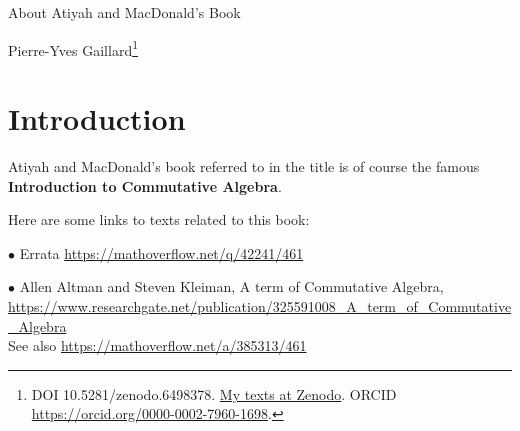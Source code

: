 \documentclass[12pt,letterpaper]{article}%
\newcommand{\oo}{\operatorname}\newcommand{\ooo}{\operatorname*}
\newcommand{\bu}{\bullet}
\newcommand{\nn}{\noindent}
\begin{document}

\begin{center}{\Huge About Atiyah and MacDonald's Book}\bigskip 

Pierre-Yves Gaillard\footnote{DOI 10.5281/zenodo.6498378. \href{https://tinyurl.com/3r5vscy8}{My texts at Zenodo}. ORCID \url{https://orcid.org/0000-0002-7960-1698}.} 
\end{center}



\tableofcontents

\newpage

\section{Introduction}\label{intro}%

Atiyah and MacDonald's book referred to in the title is of course the famous \textbf{Introduction to Commutative Algebra}. 

Here are some links to texts related to this book: 

\nn$\bu$ Errata \href{https://mathoverflow.net/q/42241/461}{https://mathoverflow.net/q/42241/461}

\nn$\bu$ Allen Altman and Steven Kleiman, A term of Commutative Algebra, \\ \href{https://www.researchgate.net/publication/325591008_A_term_of_Commutative_Algebra}{https://www.researchgate.net/publication/325591008\_A\_term\_of\_Commutative\_Algebra}\\ See also \href{https://mathoverflow.net/a/385313/461}{https://mathoverflow.net/a/385313/461} %
\end{document}

